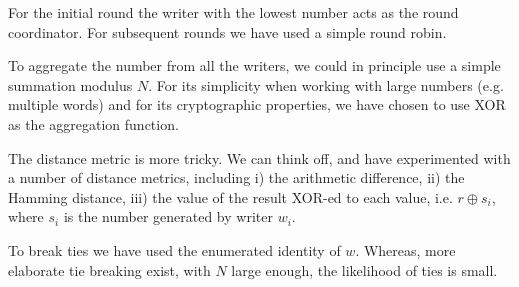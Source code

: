 \documentclass[10pt]{article}
\begin{document}

For the initial round the writer with the lowest number acts as the round coordinator. For subsequent rounds we have used a simple round robin. 

To aggregate the number from all the writers, we could in principle use a simple summation modulus $N$. For its simplicity when working with large numbers (e.g. multiple words) and for its cryptographic properties, we have chosen to use XOR as the aggregation function.

The distance metric is more tricky. We can think off, and have experimented with a number of distance metrics, including i) the arithmetic difference, ii) the Hamming distance, iii) the value of the result XOR-ed to each value, i.e. $r \oplus s_i$, where $s_i$ is the number generated by writer $w_i$. 

To break ties we have used the enumerated identity of $w$. Whereas, more elaborate tie breaking exist, with $N$ large enough, the likelihood of ties is small.



\end{document}
